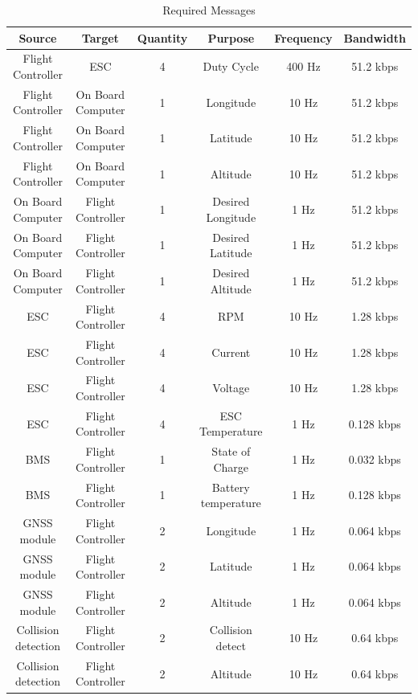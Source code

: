     \begin{table}[]
        \begin{tabular}{|c|c|c|c|c|c|} 
         \textbf{Source}             & \textbf{Target}            & \textbf{Quantity}   & \textbf{Purpose}& \textbf{Frequency} & \textbf{Bandwidth}\\
         \hline
         Flight Controller  & \gls{ESC}         & 4    & Duty Cycle        & 400 Hz & 51.2 kbps \\
         Flight Controller  & On Board Computer & 1    & Longitude         & 10 Hz  & 51.2 kbps \\
         Flight Controller  & On Board Computer & 1    & Latitude         & 10 Hz   & 51.2 kbps \\
         Flight Controller  & On Board Computer & 1    & Altitude         & 10 Hz   & 51.2 kbps \\
         On Board Computer  & Flight Controller & 1    & Desired Longitude & 1 Hz & 51.2 kbps \\
         On Board Computer  & Flight Controller & 1    & Desired Latitude & 1 Hz      & 51.2 kbps \\
         On Board Computer  & Flight Controller & 1    & Desired Altitude & 1 Hz   & 51.2 kbps \\
         \gls{ESC}          & Flight Controller & 4    & \gls{RPM}         & 10 Hz     & 1.28 kbps \\
         \gls{ESC}          & Flight Controller & 4    & Current           & 10 Hz     & 1.28 kbps \\
         \gls{ESC}          & Flight Controller & 4    & Voltage           & 10 Hz     & 1.28 kbps \\
         \gls{ESC}          & Flight Controller & 4    & \gls{ESC} Temperature & 1 Hz    & 0.128 kbps \\
         \gls{BMS}          & Flight Controller & 1    & State of Charge & 1 Hz     & 0.032 kbps \\
         \gls{BMS}          & Flight Controller & 1    & Battery temperature & 1 Hz     & 0.128 kbps \\
         \gls{GNSS} module  & Flight Controller & 2    & Longitude  & 1 Hz       & 0.064 kbps \\
         \gls{GNSS} module  & Flight Controller & 2    & Latitude   & 1 Hz     & 0.064 kbps \\
         \gls{GNSS} module  & Flight Controller & 2    & Altitude   & 1 Hz      & 0.064 kbps \\
         Collision detection  & Flight Controller & 2    & Collision detect  & 10 Hz     & 0.64 kbps \\
         Collision detection& Flight Controller & 2    & Altitude  & 10 Hz      & 0.64 kbps \\
         \hline
        \end{tabular}
        \caption{Required Messages}
        \label{tab:device_comms_requirementsl}
    \end{table}
    
